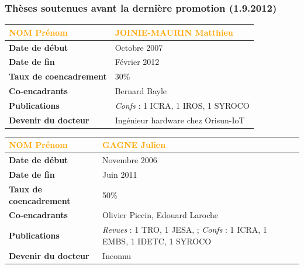 \documentclass[a4paper,12pt]{article}
\newcommand{\separation}{\noindent{\color{black!40}\rule{\textwidth}{1pt}}}
\begin{document}
\newrefsection
\nocite{2-RRCG14,2-RCGR14,5-RRCG13,4-RRG12a,4-RRG12,4-RCRG12,2-RRBG11}
\printbibliography[title={\small Publications du doctorant}]

\newpage
\subsubsection{Thèses soutenues avant la dernière promotion (1.9.2012)}

%
%
\begin{table}[htbp]
\label{tab:Matthieu}
\centering
\begin{tabular}{>{\bfseries}ll}
\toprule %
\textup{\textcolor{orange}{NOM Prénom}} & \large{\textcolor{orange}{JOINIE-MAURIN Matthieu}}\\
\midrule
Date de début               & Octobre 2007\\
Date de fin                 & Février 2012\\
Taux de coencadrement       & 30\%\\
Co-encadrants               & Bernard Bayle\\
Publications                & \emph{Confs} : 1 ICRA, 1 IROS, 1 SYROCO \\
Devenir du docteur          & Ingénieur hardware chez Orisun-IoT \\
\bottomrule
\end{tabular}
\end{table}

\newrefsection
\nocite{1-BJBG14,4-JBG11,4-JRBP10,4-JBBG09,7-JBBG09}
\printbibliography[title={\small Publications du doctorant}]

\separation{}

\newpage
%
%
\begin{table}[htbp]
\label{tab:Julien}
\centering
\begin{tabular}{>{\bfseries}ll}
\toprule %
\textup{\textcolor{orange}{NOM Prénom}} & \large{\textcolor{orange}{GAGNE Julien}}\\
\midrule
Date de début               & Novembre 2006\\
Date de fin                 & Juin 2011\\
Taux de coencadrement       & 50\%\\
Co-encadrants               & Olivier Piccin, Edouard Laroche\\
Publications                & \emph{Revues} : 1 TRO, 1 JESA,  ; \emph{Confs} : 1 ICRA, 1 EMBS, 1 IDETC, 1 SYROCO \\
Devenir du docteur          & Inconnu \\
\bottomrule
\end{tabular}
\end{table}
\end{document}
